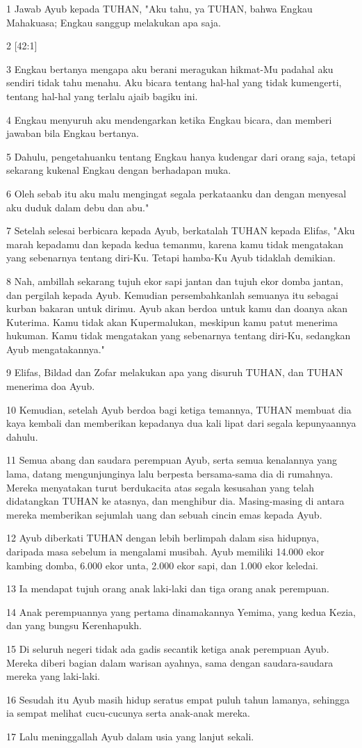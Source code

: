 \par 1 Jawab Ayub kepada TUHAN, "Aku tahu, ya TUHAN, bahwa Engkau Mahakuasa; Engkau sanggup melakukan apa saja.
\par 2 [42:1]
\par 3 Engkau bertanya mengapa aku berani meragukan hikmat-Mu padahal aku sendiri tidak tahu menahu. Aku bicara tentang hal-hal yang tidak kumengerti, tentang hal-hal yang terlalu ajaib bagiku ini.
\par 4 Engkau menyuruh aku mendengarkan ketika Engkau bicara, dan memberi jawaban bila Engkau bertanya.
\par 5 Dahulu, pengetahuanku tentang Engkau hanya kudengar dari orang saja, tetapi sekarang kukenal Engkau dengan berhadapan muka.
\par 6 Oleh sebab itu aku malu mengingat segala perkataanku dan dengan menyesal aku duduk dalam debu dan abu."
\par 7 Setelah selesai berbicara kepada Ayub, berkatalah TUHAN kepada Elifas, "Aku marah kepadamu dan kepada kedua temanmu, karena kamu tidak mengatakan yang sebenarnya tentang diri-Ku. Tetapi hamba-Ku Ayub tidaklah demikian.
\par 8 Nah, ambillah sekarang tujuh ekor sapi jantan dan tujuh ekor domba jantan, dan pergilah kepada Ayub. Kemudian persembahkanlah semuanya itu sebagai kurban bakaran untuk dirimu. Ayub akan berdoa untuk kamu dan doanya akan Kuterima. Kamu tidak akan Kupermalukan, meskipun kamu patut menerima hukuman. Kamu tidak mengatakan yang sebenarnya tentang diri-Ku, sedangkan Ayub mengatakannya."
\par 9 Elifas, Bildad dan Zofar melakukan apa yang disuruh TUHAN, dan TUHAN menerima doa Ayub.
\par 10 Kemudian, setelah Ayub berdoa bagi ketiga temannya, TUHAN membuat dia kaya kembali dan memberikan kepadanya dua kali lipat dari segala kepunyaannya dahulu.
\par 11 Semua abang dan saudara perempuan Ayub, serta semua kenalannya yang lama, datang mengunjunginya lalu berpesta bersama-sama dia di rumahnya. Mereka menyatakan turut berdukacita atas segala kesusahan yang telah didatangkan TUHAN ke atasnya, dan menghibur dia. Masing-masing di antara mereka memberikan sejumlah uang dan sebuah cincin emas kepada Ayub.
\par 12 Ayub diberkati TUHAN dengan lebih berlimpah dalam sisa hidupnya, daripada masa sebelum ia mengalami musibah. Ayub memiliki 14.000 ekor kambing domba, 6.000 ekor unta, 2.000 ekor sapi, dan 1.000 ekor keledai.
\par 13 Ia mendapat tujuh orang anak laki-laki dan tiga orang anak perempuan.
\par 14 Anak perempuannya yang pertama dinamakannya Yemima, yang kedua Kezia, dan yang bungsu Kerenhapukh.
\par 15 Di seluruh negeri tidak ada gadis secantik ketiga anak perempuan Ayub. Mereka diberi bagian dalam warisan ayahnya, sama dengan saudara-saudara mereka yang laki-laki.
\par 16 Sesudah itu Ayub masih hidup seratus empat puluh tahun lamanya, sehingga ia sempat melihat cucu-cucunya serta anak-anak mereka.
\par 17 Lalu meninggallah Ayub dalam usia yang lanjut sekali.


